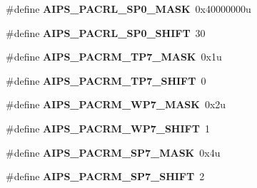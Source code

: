 \begin{DoxyCompactItemize}
\item 
\hypertarget{group___a_i_p_s___register___masks_ga57d8e6c512f706b15c738de291de079b}{}\#define {\bfseries A\+I\+P\+S\+\_\+\+P\+A\+C\+R\+L\+\_\+\+S\+P0\+\_\+\+M\+A\+S\+K}~0x40000000u\label{group___a_i_p_s___register___masks_ga57d8e6c512f706b15c738de291de079b}

\item 
\hypertarget{group___a_i_p_s___register___masks_ga1fb5b6e8699d14ecbb8698c7e9c98c5b}{}\#define {\bfseries A\+I\+P\+S\+\_\+\+P\+A\+C\+R\+L\+\_\+\+S\+P0\+\_\+\+S\+H\+I\+F\+T}~30\label{group___a_i_p_s___register___masks_ga1fb5b6e8699d14ecbb8698c7e9c98c5b}

\item 
\hypertarget{group___a_i_p_s___register___masks_gab1b4268a6ecb331c6b993fa656528a47}{}\#define {\bfseries A\+I\+P\+S\+\_\+\+P\+A\+C\+R\+M\+\_\+\+T\+P7\+\_\+\+M\+A\+S\+K}~0x1u\label{group___a_i_p_s___register___masks_gab1b4268a6ecb331c6b993fa656528a47}

\item 
\hypertarget{group___a_i_p_s___register___masks_gaaf1538667d3a7ecbb44037b94f52ded1}{}\#define {\bfseries A\+I\+P\+S\+\_\+\+P\+A\+C\+R\+M\+\_\+\+T\+P7\+\_\+\+S\+H\+I\+F\+T}~0\label{group___a_i_p_s___register___masks_gaaf1538667d3a7ecbb44037b94f52ded1}

\item 
\hypertarget{group___a_i_p_s___register___masks_ga8ad034a32c127eaf97de2057ea979568}{}\#define {\bfseries A\+I\+P\+S\+\_\+\+P\+A\+C\+R\+M\+\_\+\+W\+P7\+\_\+\+M\+A\+S\+K}~0x2u\label{group___a_i_p_s___register___masks_ga8ad034a32c127eaf97de2057ea979568}

\item 
\hypertarget{group___a_i_p_s___register___masks_gab4675f7275ab835675c72b5f0a0d8ab2}{}\#define {\bfseries A\+I\+P\+S\+\_\+\+P\+A\+C\+R\+M\+\_\+\+W\+P7\+\_\+\+S\+H\+I\+F\+T}~1\label{group___a_i_p_s___register___masks_gab4675f7275ab835675c72b5f0a0d8ab2}

\item 
\hypertarget{group___a_i_p_s___register___masks_ga3c6a7b0a9525f9dd09e5d64bad2ba190}{}\#define {\bfseries A\+I\+P\+S\+\_\+\+P\+A\+C\+R\+M\+\_\+\+S\+P7\+\_\+\+M\+A\+S\+K}~0x4u\label{group___a_i_p_s___register___masks_ga3c6a7b0a9525f9dd09e5d64bad2ba190}

\item 
\hypertarget{group___a_i_p_s___register___masks_ga7293cbe73c765a6a916311c21eb0c74d}{}\#define {\bfseries A\+I\+P\+S\+\_\+\+P\+A\+C\+R\+M\+\_\+\+S\+P7\+\_\+\+S\+H\+I\+F\+T}~2\label{group___a_i_p_s___register___masks_ga7293cbe73c765a6a916311c21eb0c74d}


\end{DoxyCompactItemize}
